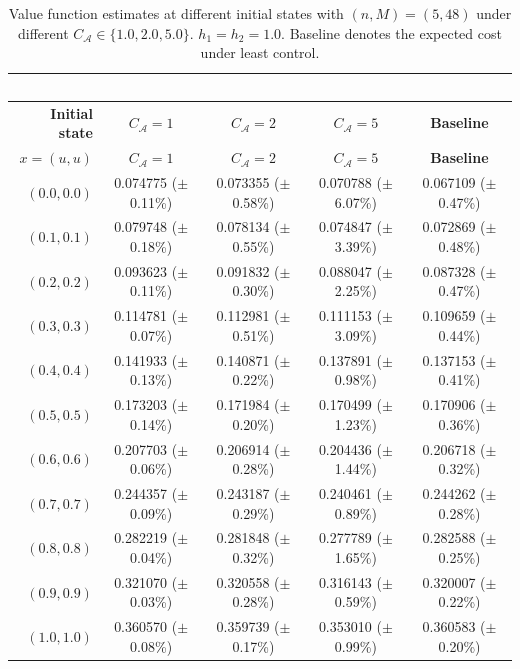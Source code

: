 \documentclass[11pt]{article}
\theoremstyle{definition}
\theoremstyle{plain}
\begin{document}
\begin{longtable}{@{}rcccc@{}}
  \caption{Value function estimates at different initial states with $(n,M) = (5,48)$ 
  under different $C_{\mathcal{A}} \in \{1.0, 2.0, 5.0\}$. $h_1 = h_2 = 1.0$. 
  Baseline denotes the expected cost under least control.
  }\label{tab:summary-level5}\ \\
  \toprule
  \textbf{Initial state} & \textbf{$C_{\mathcal A}=1$} & \textbf{$C_{\mathcal A}=2$} & \textbf{$C_{\mathcal A}=5$} & \textbf{Baseline} \\
  \midrule
  \endfirsthead
  \toprule
  \textbf{$x=(u,u)$} & \textbf{$C_{\mathcal A}=1$} & \textbf{$C_{\mathcal A}=2$} & \textbf{$C_{\mathcal A}=5$} & \textbf{Baseline} \\
  \midrule
  \endhead
  $(0.0,0.0)$ & 0.074775 (\(\pm\) 0.11\%) & 0.073355 (\(\pm\) 0.58\%) & 0.070788 (\(\pm\) 6.07\%) & 0.067109 (\(\pm\) 0.47\%) \\
  $(0.1,0.1)$ & 0.079748 (\(\pm\) 0.18\%) & 0.078134 (\(\pm\) 0.55\%) & 0.074847 (\(\pm\) 3.39\%) & 0.072869 (\(\pm\) 0.48\%) \\
  $(0.2,0.2)$ & 0.093623 (\(\pm\) 0.11\%) & 0.091832 (\(\pm\) 0.30\%) & 0.088047 (\(\pm\) 2.25\%) & 0.087328 (\(\pm\) 0.47\%) \\
  $(0.3,0.3)$ & 0.114781 (\(\pm\) 0.07\%) & 0.112981 (\(\pm\) 0.51\%) & 0.111153 (\(\pm\) 3.09\%) & 0.109659 (\(\pm\) 0.44\%) \\
  $(0.4,0.4)$ & 0.141933 (\(\pm\) 0.13\%) & 0.140871 (\(\pm\) 0.22\%) & 0.137891 (\(\pm\) 0.98\%) & 0.137153 (\(\pm\) 0.41\%) \\
  $(0.5,0.5)$ & 0.173203 (\(\pm\) 0.14\%) & 0.171984 (\(\pm\) 0.20\%) & 0.170499 (\(\pm\) 1.23\%) & 0.170906 (\(\pm\) 0.36\%) \\
  $(0.6,0.6)$ & 0.207703 (\(\pm\) 0.06\%) & 0.206914 (\(\pm\) 0.28\%) & 0.204436 (\(\pm\) 1.44\%) & 0.206718 (\(\pm\) 0.32\%) \\
  $(0.7,0.7)$ & 0.244357 (\(\pm\) 0.09\%) & 0.243187 (\(\pm\) 0.29\%) & 0.240461 (\(\pm\) 0.89\%) & 0.244262 (\(\pm\) 0.28\%) \\
  $(0.8,0.8)$ & 0.282219 (\(\pm\) 0.04\%) & 0.281848 (\(\pm\) 0.32\%) & 0.277789 (\(\pm\) 1.65\%) & 0.282588 (\(\pm\) 0.25\%) \\
  $(0.9,0.9)$ & 0.321070 (\(\pm\) 0.03\%) & 0.320558 (\(\pm\) 0.28\%) & 0.316143 (\(\pm\) 0.59\%) & 0.320007 (\(\pm\) 0.22\%) \\
  $(1.0,1.0)$ & 0.360570 (\(\pm\) 0.08\%) & 0.359739 (\(\pm\) 0.17\%) & 0.353010 (\(\pm\) 0.99\%) & 0.360583 (\(\pm\) 0.20\%) \\
  \bottomrule
\end{longtable}
\end{document}
